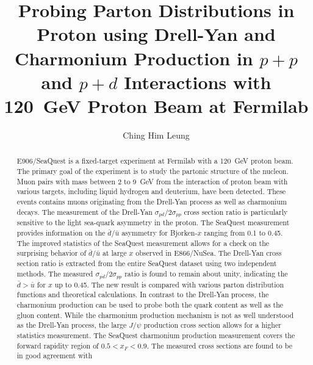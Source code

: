 \documentclass[final]{uiucthesis2021}
\begin{document}
\title{Probing Parton Distributions in Proton using Drell-Yan and Charmonium Production
	in \texorpdfstring{$p+p$}{p+p} and \texorpdfstring{$p+d$}{p+d} Interactions with
	\texorpdfstring{\SI{120}{\GeV}}{120~GeV} Proton Beam at Fermilab}
\author{Ching Him Leung}

\phdthesis
{}
\maketitle
\frontmatter

\begin{abstract}
	E906/SeaQuest is a fixed-target experiment at Fermilab with a \SI{120}{\GeV} proton beam.
	The primary goal of the experiment is to study the partonic structure of the nucleon.
	Muon pairs with mass between \num{2} to \SI{9}{\GeV} from the
	interaction of proton beam with various targets,
	including liquid hydrogen and deuterium, have been detected.
	These events contains muons originating from the Drell-Yan process as well as charmonium decays.
	The measurement of the Drell-Yan $\sigma_{pd}/2\sigma_{pp}$ cross section
	ratio is particularly sensitive to the light sea-quark asymmetry in the proton.
	The SeaQuest measurement provides information on the $\bar{d}/\bar{u}$ asymmetry
	for  Bjorken-$x$ ranging from \num{0.1} to \num{0.45}.
	The improved statistics	of the SeaQuest measurement allows for a check on the surprising behavior of
	$\bar{d}/\bar{u}$ at large $x$ observed in E866/NuSea.
	The Drell-Yan cross section ratio is extracted from the entire SeaQuest dataset
	using two independent methods.
	The measured $\sigma_{pd}/2\sigma_{pp}$ ratio is found to remain about unity,
	indicating the $\bar{d}>\bar{u}$ for $x$ up to \num{0.45}.
	The new result is compared with various parton distribution functions and theoretical calculations.
	In contrast to the Drell-Yan process, the charmonium production can be used to probe both the quark
	content as well as the gluon content.
	While the charmonium production mechanism is not as well understood as the Drell-Yan process,
	the large $J/\psi$ production cross section allows for a higher statistics measurement.
	The SeaQuest charmonium production measurement covers the forward rapidity region of $0.5 < x_F <0.9$.
	The measured cross sections are found to be in good agreement with

\end{abstract}
\end{document}
